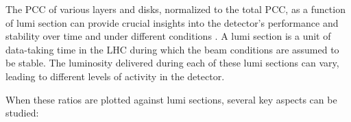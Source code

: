 


The PCC of various layers and disks, normalized to the total PCC, as a function of lumi section can provide crucial insights into the detector's performance and stability over time and under different conditions \cite{CMS-PAS-LUM-16-001}. A lumi section is a unit of data-taking time in the LHC during which the beam conditions are assumed to be stable. The luminosity delivered during each of these lumi sections can vary, leading to different levels of activity in the detector.

When these ratios are plotted against lumi sections, several key aspects can be studied:

